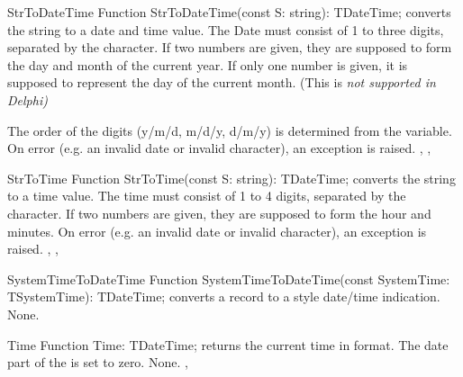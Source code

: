 \html{}

\begin{function}{StrToDateTime}
\Declaration
Function StrToDateTime(const S: string): TDateTime;
\Description
{} converts the string  to a  date 
and time value. The Date must consist of 1 to three digits, separated by the 
 character. If two numbers are given, they
are supposed to form the day and month of the current year. If only 
one number is given, it is supposed to represent the day of the 
current month. (This is \em{not} supported in Delphi)

The order of the digits (y/m/d, m/d/y, d/m/y) is determined from the 
 variable.
\Errors
On error (e.g. an invalid date or invalid character), 
an  exception is raised.
\SeeAlso
{}, , 
\end{function}

\html{}
 
\begin{function}{StrToTime}
\Declaration
Function StrToTime(const S: string): TDateTime;
\Description
{} converts the string  to a  time 
value. The time must consist of 1 to 4 digits, separated by the 
 character. If two numbers are given, they
are supposed to form the hour and minutes. 
\Errors
On error (e.g. an invalid date or invalid character), 
an  exception is raised.
\SeeAlso
{}, , 
\end{function}

\html{}

\begin{function}{SystemTimeToDateTime}
\Declaration
Function SystemTimeToDateTime(const SystemTime: TSystemTime): TDateTime;
\Description
{} converts a  record to a
 style date/time indication.
\Errors
None.
\SeeAlso
{}
\end{function}

\html{}

\begin{function}{Time}
\Declaration
Function Time: TDateTime;
\Description
{} returns the current time in  format. The date
part of the  is set to zero.
\Errors
None.
\SeeAlso
{}, 
\end{function}


